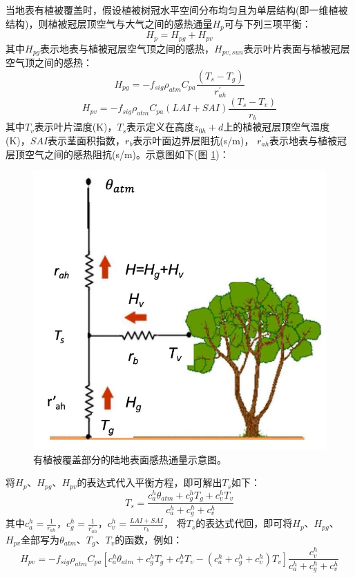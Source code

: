 当地表有植被覆盖时，假设植被树冠水平空间分布均匀且为单层结构(即一维植被结构)，则植被冠层顶空气与大气之间的感热通量$H_p$可与下列三项平衡：
\begin{equation}
H_{p}=H_{p g}+H_{p v}
\end{equation}
其中$H_{pg}$表示地表与植被冠层空气顶之间的感热，$H_{pv,sun}$表示叶片表面与植被冠层空气顶之间的感热：
\begin{equation}
H_{p g}=-f_{sig} \rho_{atm} C_{pa} \frac{\left(T_{s}-T_{g}\right)}{r_{a h}^{\prime}}
\end{equation}
\begin{equation}
H_{p v}=-f_{sig} \rho_{atm} C_{pa}(LAI+S A I) \frac{\left(T_{s}-T_{v}\right)}{r_{b}}
\end{equation}
其中$T_v$表示叶片温度(K)，$T_s$表示定义在高度$z_{0h}+d$上的植被冠层顶空气温度(K)，$SAI$表示茎面积指数，$r_b$表示叶面边界层阻抗(s/m)，
$r_{ah}^\prime$表示地表与植被冠层顶空气之间的感热阻抗(s/m)。示意图如下(图 \ref{fig:有植被覆盖部分的陆地表面感热通量示意图})：
{
\begin{figure}[]
\centering
\includegraphics{Figures/地表湍流交换过程/有植被覆盖部分的陆地表面感热通量示意图.png}
\caption{有植被覆盖部分的陆地表面感热通量示意图。}
\label{fig:有植被覆盖部分的陆地表面感热通量示意图}
\end{figure}
}
将$H_p$、$H_{pg}$、$H_{pv}$的表达式代入平衡方程，即可解出$T_s$如下：
\begin{equation}
T_{s}=\frac{c_{a}^{h} \theta_{atm}+c_{g}^{h} T_{g}+c_{v}^{h} T_{v}}{c_{a}^{h}+c_{g}^{h}+c_{v}^{h}}
\end{equation}
其中$c_a^h=\frac{1}{r_{ah}}$，$c_g^h=\frac{1}{r_{ah}^\prime}$，$c_v^h=\frac{LAI+SAI}{r_b}$，
将$T_s$的表达式代回，即可将$H_p$、$H_{pg}$、$H_{pv}$全部写为$\theta_{atm}$、$T_g$、$T_v$的函数，例如：
\begin{equation}
H_{p v}=-f_{sig} \rho_{atm} C_{p a}\left[c_{a}^{h} \theta_{atm}+c_{g}^{h} 
T_{g}+c_{v}^{h} T_{v}-\left(c_{a}^{h}+c_{g}^{h}+c_{v}^{h}\right)
T_{v}\right] \frac{c_{v}^{h}}{c_{a}^{h}+c_{g}^{h}+c_{v}^{h}}
\end{equation}


